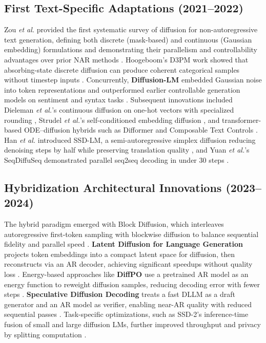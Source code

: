 \subsection{First Text-Specific Adaptations (2021–2022)}
Zou \emph{et al.} provided the first systematic survey of diffusion for non-autoregressive text generation, defining both discrete (mask-based) and continuous (Gaussian embedding) formulations and demonstrating their parallelism and controllability advantages over prior NAR methods \cite{zou_survey_2023}. Hoogeboom’s D3PM work showed that absorbing-state discrete diffusion can produce coherent categorical samples without timestep inputs \cite{hoogeboom_structured_2021}. Concurrently, \textbf{Diffusion-LM} embedded Gaussian noise into token representations and outperformed earlier controllable generation models on sentiment and syntax tasks \cite{li_diffusion-lm_2022}. Subsequent innovations included Dieleman \emph{et al.}’s continuous diffusion on one-hot vectors with specialized rounding \cite{dieleman_continuous_2022}, Strudel \emph{et al.}’s self-conditioned embedding diffusion \cite{strudel_selfconditioned_2021}, and transformer-based ODE–diffusion hybrids such as Difformer \cite{gong_difformer_2022} and Composable Text Controls \cite{liu_composable_2022}. Han \emph{et al.} introduced SSD-LM, a semi-autoregressive simplex diffusion reducing denoising steps by half while preserving translation quality \cite{han_ssdlm_2022}, and Yuan \emph{et al.}’s SeqDiffuSeq demonstrated parallel seq2seq decoding in under 30 steps \cite{yuan_seqdiffuseq_2021}.

\subsection{Hybridization Architectural Innovations (2023–2024)}
The hybrid paradigm emerged with \textbf{}{Block Diffusion}, which interleaves autoregressive first-token sampling with blockwise diffusion to balance sequential fidelity and parallel speed \cite{arriola_block_2025}. \textbf{Latent Diffusion for Language Generation} projects token embeddings into a compact latent space for diffusion, then reconstructs via an AR decoder, achieving significant speedups without quality loss \cite{lovelace_latent_2023}. Energy-based approaches like \textbf{DiffPO} use a pretrained AR model as an energy function to reweight diffusion samples, reducing decoding error with fewer steps \cite{xu_energy-based_2025}. \textbf{Speculative Diffusion Decoding} treats a fast DLLM as a draft generator and an AR model as verifier, enabling near-AR quality with reduced sequential passes \cite{christopher_speculative_2025}. Task-specific optimizations, such as SSD-2’s inference-time fusion of small and large diffusion LMs, further improved throughput and privacy by splitting computation \cite{han_david_2024}.

